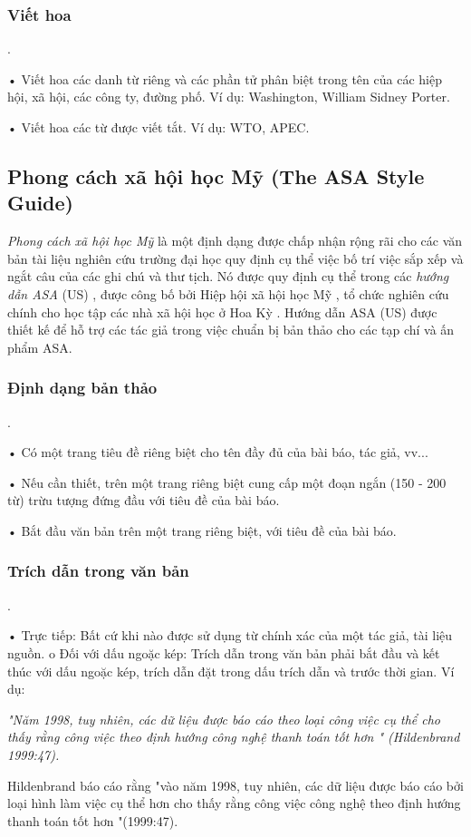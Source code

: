 \documentclass{hcmutarticle}
\begin{document}
\subsubsection{Viết hoa}.

• Viết hoa các danh từ riêng và các phần tử phân biệt trong tên của các hiệp hội, xã hội, các công ty, đường phố. Ví dụ: Washington, William Sidney Porter.

• Viết hoa các từ được viết tắt. Ví dụ: WTO, APEC.

\subsection{Phong cách xã hội học Mỹ (The ASA Style Guide)}

{\em Phong cách xã hội học Mỹ }là một định dạng được chấp nhận rộng rãi cho các văn bản tài liệu nghiên cứu trường đại học quy định cụ thể việc bố trí việc sắp xếp và ngắt câu của các ghi chú và thư tịch. Nó được quy định cụ thể trong các {\em hướng dẫn ASA} (US) , được công bố bởi Hiệp hội xã hội học Mỹ , tổ chức nghiên cứu chính cho học tập các nhà xã hội học ở Hoa Kỳ . Hướng dẫn ASA (US) được thiết kế để hỗ trợ các tác giả trong việc chuẩn bị bản thảo cho các tạp chí và ấn phẩm ASA.

\subsubsection{Định dạng bản thảo}.

 • Có một trang tiêu đề riêng biệt cho tên đầy đủ của bài báo, tác giả, vv...
 
 • Nếu cần thiết, trên một trang riêng biệt cung cấp một đoạn ngắn (150 - 200 từ) trừu tượng đứng đầu với tiêu đề của bài báo. 
 
 • Bắt đầu văn bản trên một trang riêng biệt, với tiêu đề của bài báo.
 
 \subsubsection{Trích dẫn trong văn bản}.
 
 • Trực tiếp: Bất cứ khi nào được sử dụng từ chính xác của một tác giả, tài liệu nguồn. 
 o Đối với dấu ngoặc kép: 
 Trích dẫn trong văn bản phải bắt đầu và kết thúc với dấu ngoặc kép, trích dẫn đặt trong dấu trích dẫn và trước thời gian. Ví dụ:
 
 {\em "Năm 1998, tuy nhiên, các dữ liệu được báo cáo theo loại công việc cụ thể cho thấy rằng công việc theo định hướng công nghệ thanh toán tốt hơn " (Hildenbrand 1999:47). 
 
 Hildenbrand báo cáo rằng "vào năm 1998, tuy nhiên, các dữ liệu được báo cáo bởi loại hình làm việc cụ thể hơn cho thấy rằng công việc công nghệ theo định hướng thanh toán tốt hơn "(1999:47). }
 
\end{document}
